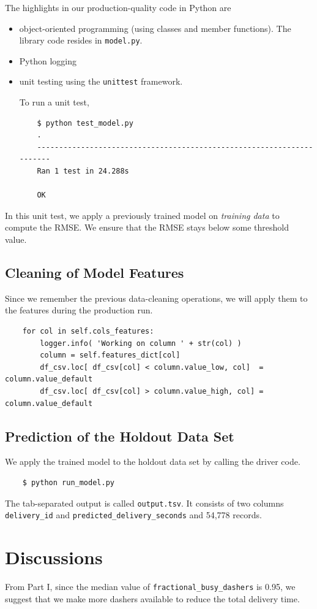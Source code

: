 \documentclass[12pt]{article}
\begin{document}
The highlights in our production-quality code in Python are
\begin{itemize}
  \item object-oriented programming (using classes and member functions).  The library code resides in \texttt{model.py}.

  \item Python logging


  \item unit testing using the \texttt{unittest} framework.

  To run a unit test,
  \begin{verbatim}
    $ python test_model.py 
    .
    ----------------------------------------------------------------------
    Ran 1 test in 24.288s

    OK
  \end{verbatim}
\end{itemize}
  In this unit test, we apply a previously trained model on \textit{training data} to compute the RMSE. We ensure that the RMSE stays below some threshold value.

\subsection{Cleaning of Model Features}

Since we remember the previous data-cleaning operations, we will apply them to the features during the production run.

      \begin{verbatim}
    for col in self.cols_features:
        logger.info( 'Working on column ' + str(col) )
        column = self.features_dict[col]
        df_csv.loc[ df_csv[col] < column.value_low, col]  = column.value_default
        df_csv.loc[ df_csv[col] > column.value_high, col] = column.value_default
      \end{verbatim}

\subsection{Prediction of the Holdout Data Set}


We apply the trained model to the holdout data set by calling the driver code.

\begin{verbatim}
    $ python run_model.py
\end{verbatim}

The tab-separated output is called \texttt{output.tsv}.  It consists of two columns \texttt{delivery\_id}
and \texttt{predicted\_delivery\_seconds} and 54,778 records.

\section{Discussions}
From Part I, since the median value of \texttt{fractional\_busy\_dashers} is 0.95, we suggest that we make more dashers available to reduce the total delivery time.
\end{document}
